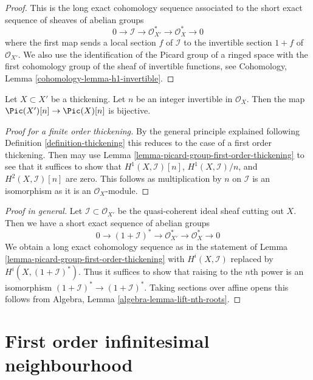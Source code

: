 \begin{proof}
This is the long exact cohomology sequence associated to the
short exact sequence of sheaves of abelian groups
$$
0 \to \mathcal{I} \to \mathcal{O}_{X'}^* \to \mathcal{O}_X^* \to 0
$$
where the first map sends a local section $f$ of $\mathcal{I}$
to the invertible section $1 + f$ of $\mathcal{O}_{X'}$.
We also use the identification of the Picard group of a
ringed space with the first cohomology group of the sheaf
of invertible functions, see
Cohomology, Lemma \ref{cohomology-lemma-h1-invertible}.
\end{proof}

\begin{lemma}
\label{lemma-torsion-pic-thickening}
Let $X \subset X'$ be a thickening. Let $n$ be an integer
invertible in $\mathcal{O}_X$. Then the map
$\Pic(X')[n] \to \Pic(X)[n]$ is bijective.
\end{lemma}

\begin{proof}[Proof for a finite order thickening]
By the general principle explained following
Definition \ref{definition-thickening}
this reduces to the case of a first order thickening.
Then may use Lemma \ref{lemma-picard-group-first-order-thickening}
to see that it suffices to show that
$H^1(X, \mathcal{I})[n]$, $H^1(X, \mathcal{I})/n$, and
$H^2(X, \mathcal{I})[n]$ are zero.
This follows as multiplication by $n$ on $\mathcal{I}$
is an isomorphism as it is an $\mathcal{O}_X$-module.
\end{proof}

\begin{proof}[Proof in general]
Let $\mathcal{I} \subset \mathcal{O}_{X'}$ be the quasi-coherent ideal
sheaf cutting out $X$. Then we have a short exact sequence of
abelian groups
$$
0 \to (1 + \mathcal{I})^* \to \mathcal{O}_{X'}^* \to \mathcal{O}_X^* \to 0
$$
We obtain a long exact cohomology sequence as in the statement of
Lemma \ref{lemma-picard-group-first-order-thickening}
with $H^i(X, \mathcal{I})$ replaced by $H^i(X, (1 + \mathcal{I})^*)$.
Thus it suffices to show that raising to the $n$th power is an
isomorphism $(1 + \mathcal{I})^* \to (1 + \mathcal{I})^*$.
Taking sections over affine opens this follows from
Algebra, Lemma \ref{algebra-lemma-lift-nth-roots}.
\end{proof}





\section{First order infinitesimal neighbourhood}
\label{section-first-order-infinitesimal-neighbourhood}

